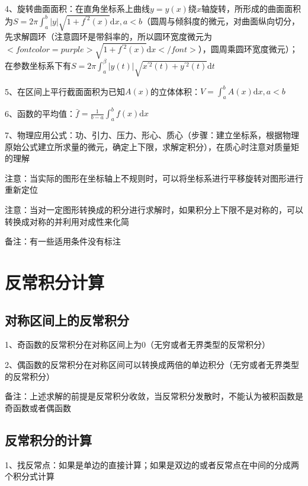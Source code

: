 4、旋转曲面面积：在直角坐标系上曲线$ y=y(x) $绕$ x $轴旋转，所形成的曲面面积为$ S=2 \pi \int_{a}^{b}|y| \sqrt{1+f^{\prime 2}(x)} \mathrm{d} x, a<b $（圆周与倾斜度的微元，对曲面纵向切分，先求解圆环（注意圆环是带斜率的，所以圆环宽度微元为$ <font color=purple>\sqrt{1+f^{\prime 2}(x)} \mathrm{d} x</font> $），圆周乘圆环宽度微元）；在参数坐标系下有$ S=2 \pi \int_{a}^{\beta}|y(t)| \sqrt{x^{\prime 2}(t)+y^{\prime 2}(t)} \mathrm{d} t $

5、在区间上平行截面面积为已知$ A(x) $的立体体积：$ V=\int_{a}^{b} A(x) \mathrm{d} x, a<b $

6、函数的平均值：$ \bar{f}=\frac{1}{b-a} \int_{a}^{b} f(x) \mathrm{d} x $

7、物理应用公式：功、引力、压力、形心、质心（步骤：建立坐标系，根据物理原始公式建立所求量的微元，确定上下限，求解定积分），在质心时注意对质量矩的理解

注意：当实际的图形在坐标轴上不规则时，可以将坐标系进行平移旋转对图形进行重新定位

注意：当对一定图形转换成的积分进行求解时，如果积分上下限不是对称的，可以转换成对称的并利用对成性来化简

备注：有一些适用条件没有标注

\section{反常积分计算}



\subsection{对称区间上的反常积分}

1、奇函数的反常积分在对称区间上为0（无穷或者无界类型的反常积分）

2、偶函数的反常积分在对称区间可以转换成两倍的单边积分（无穷或者无界类型的反常积分）

备注：上述求解的前提是反常积分收敛，当反常积分发散时，不能认为被积函数是奇函数或者偶函数



\subsection{反常积分的计算}

1、找反常点：如果是单边的直接计算；如果是双边的或者反常点在中间的分成两个积分式计算


